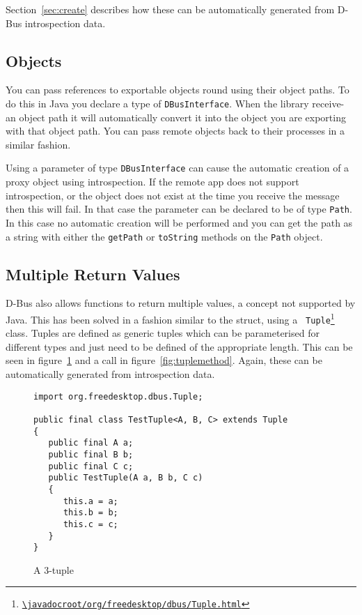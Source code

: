\documentclass[a4paper,12pt]{article}
\begin{document}
Section~\ref{sec:create} describes how these can be automatically
generated from D-Bus introspection data.

\subsection{Objects}

You can pass references to exportable objects round using their object paths.
To do this in Java you declare a type of {\tt DBusInterface}. When the library
receive- an object path it will automatically convert it into the object you
are exporting with that object path. You can pass remote objects back to their
processes in a similar fashion.

Using a parameter of type {\tt DBusInterface} can cause the automatic creation
of a proxy object using introspection. If the remote app does not support
introspection, or the object does not exist at the time you receive the message
then this will fail. In that case the parameter can be declared to be of type
{\tt Path}. In this case no automatic creation will be performed and you can
get the path as a string with either the {\tt getPath} or {\tt toString} methods
on the {\tt Path} object.


\subsection{Multiple Return Values}

D-Bus also allows functions to return multiple values, a concept not supported
by Java. This has been solved in a fashion similar to the struct, using a {\tt
Tuple\footnote{\url{\javadocroot/org/freedesktop/dbus/Tuple.html}}}
class. Tuples are defined as generic tuples which can be parameterised for
different types and just need to be defined of the appropriate length. This can
be seen in figure~\ref{fig:tuple} and a call in figure~\ref{fig:tuplemethod}.
Again, these can be automatically generated from introspection data.

\begin{figure}[htb]
\begin{center}
\begin{verbatim}
import org.freedesktop.dbus.Tuple;

public final class TestTuple<A, B, C> extends Tuple
{
   public final A a;
   public final B b;
   public final C c;
   public TestTuple(A a, B b, C c)
   {
      this.a = a;
      this.b = b;
      this.c = c;
   }
}
\end{verbatim}
\end{center}
\caption{A 3-tuple}
\label{fig:tuple}
\end{figure}
\end{document}
